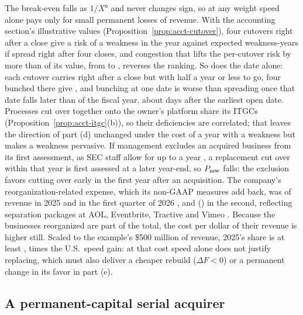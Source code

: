The break-even falls as $1/X^{\mathsf o}$ and never changes sign, so at any weight speed alone pays only for small permanent losses of revenue. With the accounting section's illustrative values (Proposition~\ref{prop:acct-cutover}), four cutovers right after a close give a \acqMwBunch{} risk of a weakness in the year against \acqMwSpread{} expected weakness-years if spread right after four closes, and congestion that lifts the per-cutover risk by more than \acqMwCrossRise{} of its value, from \acqMwOneExact{} to \acqMwCross, reverses the ranking. So does the date alone: each cutover carries \acqMwOneExact{} right after a close but \acqMwLate{} with half a year or less to go, four bunched there give \acqMwBunchLate, and bunching at one date is worse than spreading once that date falls later than \acqMwZ{} of the fiscal year, about \acqMwZdays{} days after the earliest open date. Processes cut over together onto the owner's platform share its ITGCs (Proposition~\ref{prop:acct-itgc}(b)), so their deficiencies are correlated; that leaves the direction of part (d) unchanged under the cost of a year with a weakness but makes a weakness pervasive. If management excludes an acquired business from its first assessment, as SEC staff allow for up to a year \citep[Question~3]{sec2007faq}, a replacement cut over within that year is first assessed at a later year-end, so $P_{\rm mw}$ falls: the exclusion favors cutting over early in the first year after an acquisition. The company's reorganization-related expense, which its non-GAAP measures add back, was \acqReorgTwentyFive{} of revenue in 2025 and \acqReorgQOne{} in the first quarter of 2026 \citep{bendingspoons2026prospectus}, and \acqQTwoReorgAbs{} (\acqQTwoReorgX) in the second, reflecting separation packages at AOL, Eventbrite, Tractive and Vimeo \citep{bendingspoons2026sixk}. Because the businesses reorganized are part of the total, the cost per dollar of their revenue is higher still. Scaled to the example's \$500 million of revenue, 2025's share is at least \acqReorgUsdEx, \acqReorgRatio{} times the U.S.\ speed gain: at that cost speed alone does not justify replacing, which must also deliver a cheaper rebuild ($\Delta F<0$) or a permanent change in its favor in part (e).

\subsection{A permanent-capital serial acquirer}\label{sec:acq-pc}

